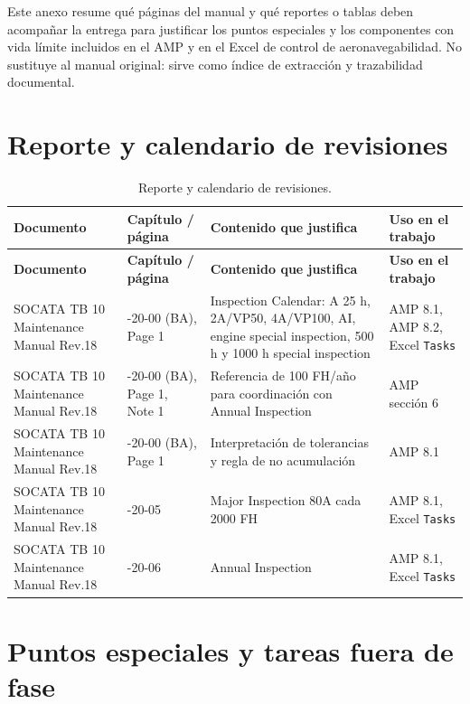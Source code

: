 \documentclass[12pt]{article}
\newcommand{\FH}{FH}
\begin{document}
Este anexo resume qué páginas del manual y qué reportes o tablas deben acompañar la entrega para justificar los puntos especiales y los componentes con vida límite incluidos en el AMP y en el Excel de control de aeronavegabilidad. No sustituye al manual original: sirve como índice de extracción y trazabilidad documental.

\section{Reporte y calendario de revisiones}
\label{sec:reporte-revisiones}

\begingroup
\small
\setlength{\tabcolsep}{4pt}
\renewcommand{\arraystretch}{1.18}
\begin{longtable}{|>{\raggedright\arraybackslash}p{}|>{\raggedright\arraybackslash}p{}|>{\raggedright\arraybackslash}p{}|>{\raggedright\arraybackslash}p{}|}
\caption{Reporte y calendario de revisiones.}
\label{tab:reporte-revisiones}\\
\hline
\textbf{Documento} & \textbf{Capítulo / página} & \textbf{Contenido que justifica} & \textbf{Uso en el trabajo} \\
\hline
\endfirsthead
\hline
\textbf{Documento} & \textbf{Capítulo / página} & \textbf{Contenido que justifica} & \textbf{Uso en el trabajo} \\
\hline
\endhead
SOCATA TB 10 Maintenance Manual Rev.18 & 05-20-00 (BA), Page 1 & Inspection Calendar: A 25 h, 2A/VP50, 4A/VP100, AI, engine special inspection, 500 h y 1000 h special inspection & AMP 8.1, AMP 8.2, Excel \texttt{Tasks} \\
\hline
SOCATA TB 10 Maintenance Manual Rev.18 & 05-20-00 (BA), Page 1, Note 1 & Referencia de 100 \FH/año para coordinación con Annual Inspection & AMP sección 6 \\
\hline
SOCATA TB 10 Maintenance Manual Rev.18 & 05-20-00 (BA), Page 1 & Interpretación de tolerancias y regla de no acumulación & AMP 8.1 \\
\hline
SOCATA TB 10 Maintenance Manual Rev.18 & 05-20-05 & Major Inspection 80A cada 2000 \FH & AMP 8.1, Excel \texttt{Tasks} \\
\hline
SOCATA TB 10 Maintenance Manual Rev.18 & 05-20-06 & Annual Inspection & AMP 8.1, Excel \texttt{Tasks} \\
\hline
\end{longtable}
\endgroup

\section{Puntos especiales y tareas fuera de fase}
\label{sec:puntos-especiales}
\end{document}
